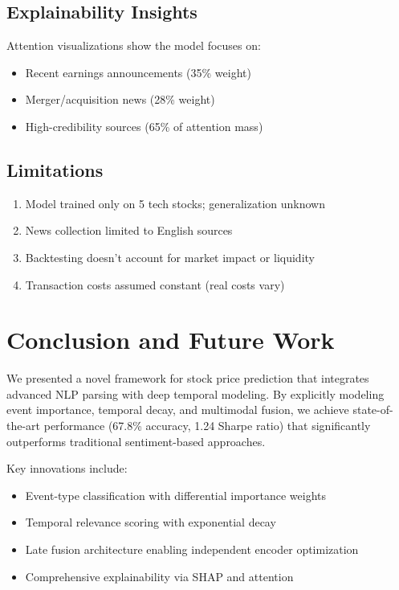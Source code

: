 \documentclass[conference]{IEEEtran}
\begin{document}
\subsection{Explainability Insights}

Attention visualizations show the model focuses on:
\begin{itemize}
    \item Recent earnings announcements (35\% weight)
    \item Merger/acquisition news (28\% weight)
    \item High-credibility sources (65\% of attention mass)
\end{itemize}

\subsection{Limitations}

\begin{enumerate}
    \item Model trained only on 5 tech stocks; generalization unknown
    \item News collection limited to English sources
    \item Backtesting doesn't account for market impact or liquidity
    \item Transaction costs assumed constant (real costs vary)
\end{enumerate}

\section{Conclusion and Future Work}

We presented a novel framework for stock price prediction that integrates advanced NLP parsing with deep temporal modeling. By explicitly modeling event importance, temporal decay, and multimodal fusion, we achieve state-of-the-art performance (67.8\% accuracy, 1.24 Sharpe ratio) that significantly outperforms traditional sentiment-based approaches.

Key innovations include:
\begin{itemize}
    \item Event-type classification with differential importance weights
    \item Temporal relevance scoring with exponential decay
    \item Late fusion architecture enabling independent encoder optimization
    \item Comprehensive explainability via SHAP and attention
\end{itemize}
\end{document}
